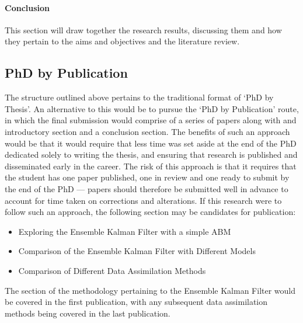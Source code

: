 \paragraph{Conclusion}

This section will draw together the research results, discussing them and how
they pertain to the aims and objectives and the literature review.

\subsection{PhD by Publication}\label{sub:structure:publication}

The structure outlined above pertains to the traditional format of `PhD by
Thesis'.
An alternative to this would be to pursue the `PhD by Publication' route, in
which the final submission would comprise of a series of papers along with and
introductory section and a conclusion section.
The benefits of such an approach would be that it would require that less time
was set aside at the end of the PhD dedicated solely to writing the thesis, and
ensuring that research is published and disseminated early in the career.
The risk of this approach is that it requires that the student has one paper
published, one in review and one ready to submit by the end of the PhD ---
papers should therefore be submitted well in advance to account for time taken
on corrections and alterations.
If this research were to follow such an approach, the following section may be
candidates for publication:
\begin{itemize}
    \item Exploring the Ensemble Kalman Filter with a simple ABM
    \item Comparison of the Ensemble Kalman Filter with Different Models
    \item Comparison of Different Data Assimilation Methods
\end{itemize}

The section of the methodology pertaining to the Ensemble Kalman Filter would be
covered in the first publication, with any subsequent data assimilation methods
being covered in the last publication.


